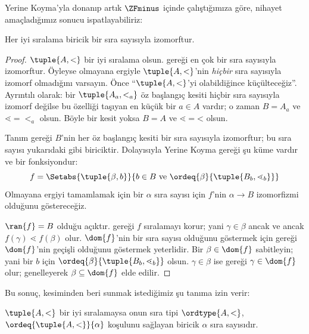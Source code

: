 


Yerine Koyma'yla donanıp artık $\ZFminus$ içinde çalıştığımıza göre,
nihayet amaçladığımız sonucu ispatlayabiliriz:

\begin{thm}
Her iyi sıralama biricik bir sıra sayısıyla izomorftur.
\end{thm}

\begin{proof}
$\tuple{A,<}$ bir iyi sıralama olsun. 
gereği en çok bir sıra sayısıyla izomorftur. Öyleyse olmayana ergiyle
$\tuple{A,<}$'nin \emph{hiçbir} sıra sayısıyla izomorf olmadığını varsayın.
Önce ``$\tuple{A,<}$'yi olabildiğince küçülteceğiz''. Ayrıntılı olarak:
bir $\tuple{A_a,<_a}$ öz başlangıç kesiti hiçbir sıra sayısıyla izomorf
değilse bu özelliği taşıyan en küçük bir $a\in A$ vardır; o zaman
$B=A_a$ ve $\mathord{\lessdot}=\mathord{<_a}$ olsun. Böyle bir kesit yoksa
$B=A$ ve $\mathord{\lessdot}=\mathord{<}$ olsun.

Tanım gereği $B$'nin her öz başlangıç kesiti bir sıra sayısıyla izomorftur;
bu sıra sayısı yukarıdaki gibi biriciktir. Dolayısıyla Yerine Koyma gereği
şu küme vardır ve bir fonksiyondur:
\[
	f = \Setabs{\tuple{\beta, b}}{b \in B\text{ ve }\ordeq{\beta}{\tuple{B_b, \lessdot_b}}}
\]
Olmayana ergiyi tamamlamak için bir $\alpha$ sıra sayısı için $f$'nin
$\alpha\to B$ izomorfizmi olduğunu göstereceğiz.

$\ran{f}=B$ olduğu açıktır.  gereği $f$
sıralamayı korur; yani $\gamma\in\beta$ ancak ve ancak
$f(\gamma)\lessdot f(\beta)$ olur. $\dom{f}$'nin bir sıra sayısı olduğunu
göstermek için  gereği $\dom{f}$'nin
geçişli olduğunu göstermek yeterlidir. Bir $\beta\in\dom{f}$ sabitleyin;
yani bir $b$ için
$\ordeq{\beta}{\tuple{B_b,\lessdot_b}}$ olsun. $\gamma\in\beta$ ise
 gereği $\gamma\in\dom{f}$ olur;
genelleyerek $\beta\subseteq\dom{f}$ elde edilir.
\end{proof}

Bu sonuç,  kesiminden beri sunmak istediğimiz şu tanıma izin
verir:

\begin{defn}
$\tuple{A,<}$ bir iyi sıralamaysa onun sıra tipi $\ordtype{A,<}$,
$\ordeq{\tuple{A,<}}{\alpha}$ koşulunu sağlayan biricik $\alpha$ sıra
sayısıdır.
\end{defn}

